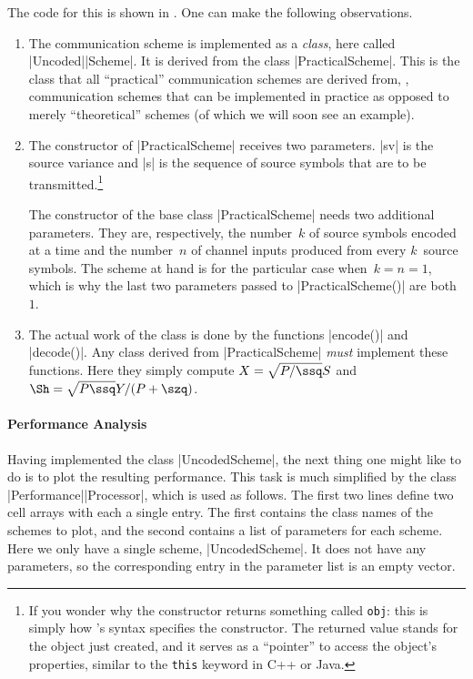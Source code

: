 The code for this is shown in .  One can make the following
observations.
\begin{enumerate}
  \item The communication scheme is implemented as a \emph{class}, here called
    |Uncoded|\-|Scheme|. It is derived from the class |PracticalScheme|. This is
    the class that all ``practical'' communication schemes are derived from,
    \ie,
    communication schemes that can be implemented in practice as opposed to
    merely ``theoretical'' schemes (of which we will soon see an example).

  \item The constructor of |PracticalScheme| receives two parameters. |sv| is
    the source variance and |s| is the sequence of source symbols that are to be
    transmitted.\footnote{If you wonder why the constructor returns something
    called \Verb+obj+: this is simply how \matlab's syntax specifies the
    constructor.  The returned value stands for the object just created, and it
    serves as a ``pointer'' to access the object's properties, similar to the
    \Verb+this+ keyword in C++ or Java.}

    The constructor of the base class |PracticalScheme| needs two additional
    parameters. They are, respectively, the number~$k$ of source symbols encoded
    at a time and the number~$n$ of channel inputs produced from every
    $k$~source symbols. The scheme at hand is for the particular case when~$k =
    n = 1$, which is why the last two parameters passed to |PracticalScheme()|
    are both~$1$.

  \item The actual work of the class is done by the functions |encode()| and
    |decode()|. Any class derived from |PracticalScheme| \emph{must} implement
    these functions. Here they simply compute $X = \sqrt{P/\ssq} S$ and $\Sh =
    \sqrt{P \ssq} Y / (P + \szq)$.
\end{enumerate}


\paragraph{Performance Analysis}

Having implemented the class |UncodedScheme|, the next thing one might like to
do is to plot the resulting performance. This task is much simplified by the
class |Performance|\-|Processor|, which is used as follows.
The first two lines define two cell arrays with each a single entry.
The first contains the class names of the schemes to plot, and
the second contains a list of parameters for each scheme. Here we only have a
single scheme, |UncodedScheme|. It does not have any parameters, so the
corresponding entry in the parameter list is an empty vector. 

